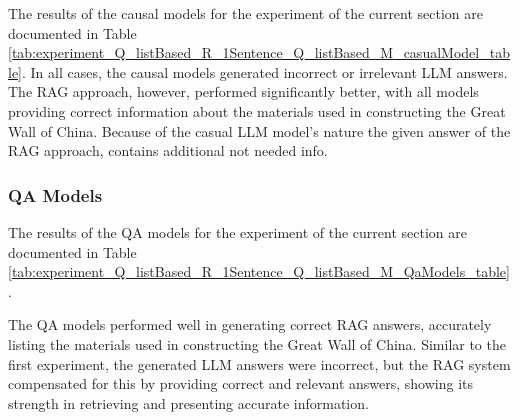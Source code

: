 \documentclass{wseas}
\begin{document}
The results of the causal models for the experiment of the current section 
are documented in Table \ref{tab:experiment_Q_listBased_R_1Sentence_Q_listBased_M_casualModel_table}.
In all cases, the causal models generated incorrect or irrelevant LLM
answers. The RAG approach, however, performed significantly better, with
all models providing correct information about the materials used in
constructing the Great Wall of China. Because of the casual LLM model's nature the given answer
of the RAG approach, contains additional not needed info.

\subsubsection{QA Models}




The results of the QA models for the experiment of the current section 
are documented in Table \ref{tab:experiment_Q_listBased_R_1Sentence_Q_listBased_M_QaModels_table}.

The QA models performed well in generating correct RAG answers,
accurately listing the materials used in constructing the Great Wall of
China. Similar to the first experiment, the generated LLM answers were
incorrect, but the RAG system compensated for this by providing correct
and relevant answers, showing its strength in retrieving and presenting
accurate information.
\end{document}
